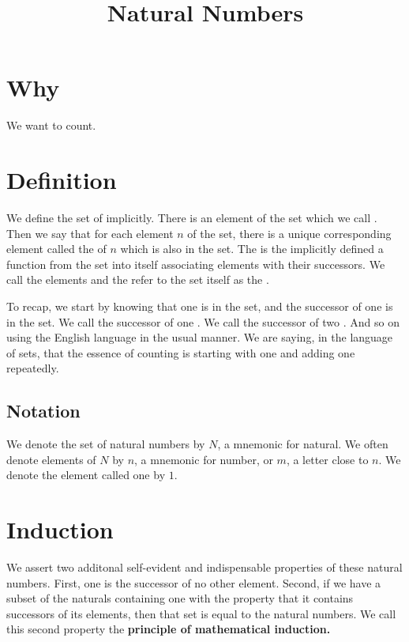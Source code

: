 






\title{Natural Numbers}

\section{Why}

We want to count.

\section{Definition}


We define the set of  implicitly.
There is an element of the set which we call .
Then we say that for each element $n$ of the set, there is a unique corresponding element called the  of $n$ which is also in the set.
The  is the implicitly defined a function from the set into itself associating elements with their successors.
We call the elements  and the refer to the set itself as the .

To recap, we start by knowing that one is in the set, and the successor of one is in the set.
We call the successor of one .
We call the successor of two .
And so on using the English language in the usual manner.
We are saying, in the language of sets, that the essence of counting is starting with one and adding one repeatedly.

\subsection{Notation}

We denote the set of natural numbers by $N$, a mnemonic for natural.
We often denote elements of $N$ by $n$, a mnemonic for number, or $m$, a letter close to $n$.
We denote the element called one by $1$.

\section{Induction}

We assert two additonal self-evident and indispensable properties of these natural numbers.
First, one is the successor of no other element.
Second, if we have a subset of the naturals containing one with the property that it contains successors of its elements, then that set is equal to the natural numbers.
We call this second property the \textbf{principle of mathematical induction.}


